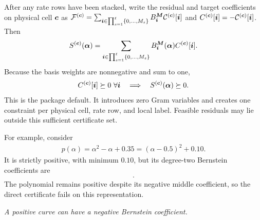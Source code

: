 After any rate rows have been stacked, write the residual and target coefficients on physical cell $\boldsymbol{c}$ as $\mathcal F^{(\boldsymbol{c})}=\sum_{\boldsymbol{i}\in\prod_{s=1}^{\ell}\{0,\ldots,M_s\}}B_{\boldsymbol{i}}^{\boldsymbol{M}}\mathcal C^{(\boldsymbol{c})}[\boldsymbol{i}]$ and $C^{(\boldsymbol{c})}[\boldsymbol{i}]=-\mathcal C^{(\boldsymbol{c})}[\boldsymbol{i}]$. Then
\begin{gather*}
 S^{(\boldsymbol{c})}(\boldsymbol{\alpha})=
  \sum_{\boldsymbol{i}\in\prod_{s=1}^{\ell}\{0,\ldots,M_s\}}B_{\boldsymbol{i}}^{\boldsymbol{M}}(\boldsymbol{\alpha})
C^{(\boldsymbol{c})}[\boldsymbol{i}].
\end{gather*}
Because the basis weights are nonnegative and sum to one,
\begin{gather*}
C^{(\boldsymbol{c})}[\boldsymbol{i}]\succeq0\ \forall\boldsymbol{i}
  \quad\Longrightarrow\quad S^{(\boldsymbol{c})}(\boldsymbol{\alpha})\succeq0.
\end{gather*}
This is the package default. It introduces zero Gram variables and creates one constraint per physical cell, rate row, and local label. Feasible residuals may lie outside this sufficient certificate set.

For example, consider
\begin{gather*}
p(\alpha)=\alpha^2-\alpha+0.35=(\alpha-0.5)^2+0.10.
\end{gather*}
It is strictly positive, with minimum $0.10$, but its degree-two Bernstein coefficients are
\begin{gather*}
[\,0.35,\,-0.15,\,0.35\,].
\end{gather*}
The polynomial remains positive despite its negative middle coefficient, so the direct certificate fails on this representation.

\begin{center}

\medskip \textit{A positive curve can have a negative Bernstein coefficient.}
\end{center}

